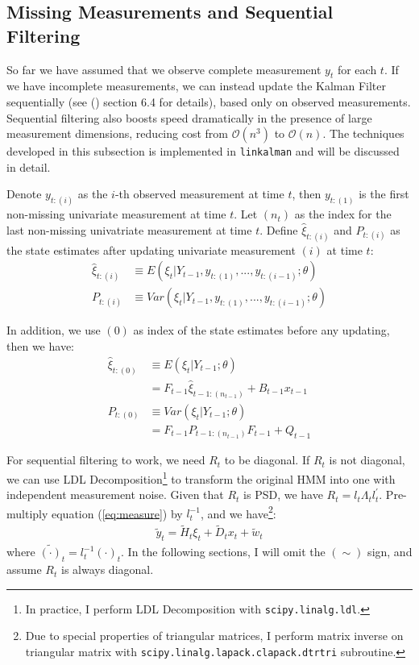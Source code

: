 \documentclass[12pt]{article}
\numberwithin{equation}{section}
\begin{document}
\subsection{Missing Measurements and Sequential Filtering} \label{subsec:seq_filter}
So far we have assumed that we observe complete measurement $y_t$ for each $t$. If we have incomplete measurements, we can instead update the Kalman Filter sequentially (see (\cite{durbin_koopman_2001}) section 6.4 for details), based only on observed measurements. Sequential filtering also boosts speed dramatically in the presence of large measurement dimensions, reducing cost from $\mathcal{O}(n^3)$ to $\mathcal{O}(n)$. The techniques developed in this subsection is implemented in \texttt{linkalman} and will be discussed in detail. 

Denote $y_{t:(i)}$ as the $i$-th observed measurement at time $t$, then $y_{t:(1)}$ is the first non-missing univariate measurement at time $t$. Let $(n_t)$ as the index for the last non-missing univatriate measurement at time $t$. Define $\hat{\xi}_{t:(i)}$ and $P_{t:(i)}$ as the state estimates after updating univariate measurement $(i)$ at time $t$:
\begin{align*}
    \hat{\xi}_{t:(i)} &\equiv E(\xi_t|Y_{t-1},y_{t:(1)},...,y_{t:(i-1)};\theta) \\
    P_{t:(i)} &\equiv Var(\xi_t|Y_{t-1},y_{t:(1)},...,y_{t:(i-1)};\theta) 
\end{align*}

In addition, we use $(0)$ as index of the state estimates before any updating, then we have:
\begin{align}
    \hat{\xi}_{t:(0)} &\equiv E(\xi_{t}|Y_{t-1};\theta)\nonumber \\
    &= F_{t-1}\hat{\xi}_{t-1:(n_{t-1})}+B_{t-1}x_{t-1} \label{eq:diff_xi_seq0} \\
    P_{t:(0)} &\equiv Var(\xi_{t}|Y_{t-1};\theta) \nonumber \\
    &= F_{t-1}P_{t-1:(n_{t-1})}F_{t-1} + Q_{t-1} \label{eq:diff_P_seq0}
\end{align}

For sequential filtering to work, we need $R_t$ to be diagonal. If $R_t$ is not diagonal, we can use LDL Decomposition\footnote{In practice, I perform LDL Decomposition with \texttt{scipy.linalg.ldl}.} to transform the original HMM into one with independent measurement noise. Given that $R_t$ is PSD, we have $R_t = l_t\Lambda_tl_t^{'}$. Pre-multiply equation (\ref{eq:measure}) by $l_t^{-1}$, and we have\footnote{Due to special properties of triangular matrices, I perform matrix inverse on triangular matrix with \texttt{scipy.linalg.lapack.clapack.dtrtri} subroutine.}:
\begin{align}
    \tilde{y}_t = \tilde{H}_t\xi_{t} + \tilde{D}_{t}x_t + \tilde{w}_t \label{eq:ldl}
\end{align}
where $\tilde{(\cdot)}_t = l_t^{-1}(\cdot)_t$. In the following sections, I will omit the $(\sim)$ sign, and assume $R_t$ is always diagonal.
\end{document}
